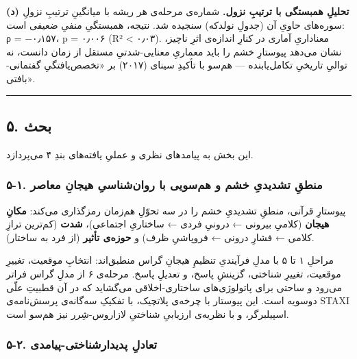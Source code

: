\documentclass[12pt,a4paper]{article}
\begin{document}
\begin{RTL}
\begin{otherlanguage}{persian}
\textbf{(د) تحلیلِ همبستگی با ترتیبِ نزول.} شماره‌ی مرحله‌ی هر ریشه با
میانگینِ ترتیبِ نزولِ سوره‌های حاویِ آن (جدولِ نولدکه) سنجیده شد. نتیجه،
همبستگیِ  منفیِ ضعیفی است: ρ = −۰٫۱۵۷، p = ۰٫۰۰۶ (R²
\textless{} ۰٫۰۳). معناداریِ آماری در کنارِ اندازه‌ی اثرِ ناچیز، نشان می‌دهد
پیوستارِ خشم را باید معماریِ معنایی-شدتیِ مستقل از زمان دانست، نه توالیِ
تاریخیِ تکامل‌یابنده --- هم‌سو با تأکیدِ سینای (۲۰۱۷) بر «تخصص‌یافتگیِ
گفتمانی-بافتی».

\begin{center}\rule{0.5\linewidth}{0.5pt}\end{center}

\subsection{۵. بحث}\label{ux628ux62dux62b}

این بخش به پیامدهای نظری و عملیِ یافته‌های بندِ ۴ می‌پردازد.

\subsubsection{۵-۱. منطقِ تشدیدیِ خشم و هم‌سویی با روان‌شناسیِ هیجانِ
معاصر}\label{ux645ux646ux637ux642-ux62aux634ux62fux6ccux62fux6cc-ux62eux634ux645-ux648-ux647ux645ux633ux648ux6ccux6cc-ux628ux627-ux631ux648ux627ux646ux634ux646ux627ux633ux6cc-ux647ux6ccux62cux627ux646-ux645ux639ux627ux635ux631}

پیوستارِ قرآنی، منطقِ تشدیدیِ خشم را در سه تحوّلِ هم‌زمان رمزگذاری می‌کند:
\textbf{مکانِ هیجان} (کلامیِ بیرونی ← درونیِ فردی ← ساختاریِ اجتماعی)،
\textbf{شدت} (کم‌ترین ترازِ کلامی ← فشارِ درونی ← فروپاشیِ ظرف) و
\textbf{حوزه‌ی تأثیر} (از فرد به ساختار).

مراحلِ ۱ تا ۵ با مدلِ فرآیندیِ تنظیمِ هیجانِ گراس منطبق‌اند: انتخابِ موقعیت،
تغییرِ موقعیت، تغییرِ شناختی، گزینشِ پاسخ، و تعدیلِ پاسخ. مرحله‌ی ۶ از مدلِ
گراس فراتر می‌رود و ساحتی برای پاتولوژی‌های ساختاری-اخلاقی می‌گشاید که در
آن قطبیتِ علّی دوسویه است. این پیوستار با چرخه‌ی پلاتچیک، با تفکیکِ سه‌گانه‌ی
پرسش‌نامه‌ی STAXI اسپیلبرگر، و با نظریه‌ی ارزیابیِ شناختیِ لازاروس-شِرر نیز
هم‌سو است.

\subsubsection{۵-۲. تعادلِ
پدیدارشناختی-پیامدی}\label{ux62aux639ux627ux62fux644-ux67eux62fux6ccux62fux627ux631ux634ux646ux627ux62eux62aux6cc-ux67eux6ccux627ux645ux62fux6cc}


\end{otherlanguage}
\end{RTL}
\end{document}

